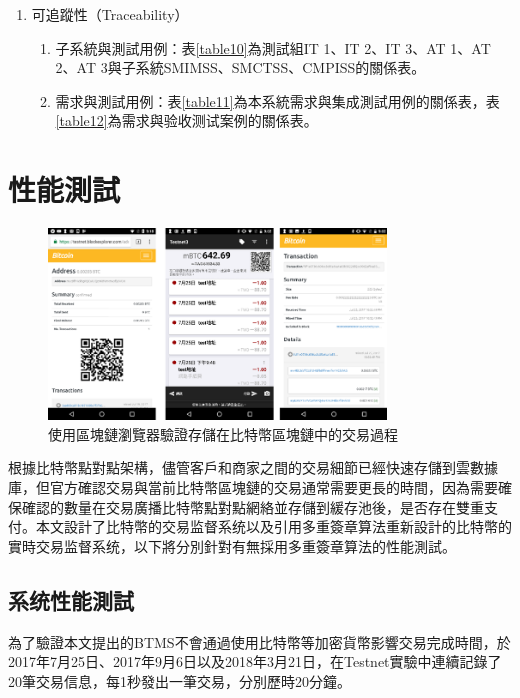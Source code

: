 \begin{enumerate}
			\item 可追蹤性（Traceability）

						

			\begin{enumerate}
				\item 子系統與測試用例：表\ref{table10}為測試組IT 1、IT 2、IT 3、AT 1、AT 2、AT 3與子系統SMIMSS、SMCTSS、CMPISS的關係表。
				\item 需求與測試用例：表\ref{table11}為本系統需求與集成測試用例的關係表，表\ref{table12}為需求與验收测试案例的關係表。
				\end{enumerate}
		\end{enumerate}







	\section{性能測試}


		\begin{figure}[!htbp]
			\centering
			\includegraphics[width = 0.8\textwidth]{fig9.png}
			\caption{使用區塊鏈瀏覽器驗證存儲在比特幣區塊鏈中的交易過程}\label{fig9}
		\end{figure}


		根據比特幣點對點架構，儘管客戶和商家之間的交易細節已經快速存儲到雲數據庫，但官方確認交易與當前比特幣區塊鏈的交易通常需要更長的時間，因為需要確保確認的數量在交易廣播比特幣點對點網絡並存儲到緩存池後，是否存在雙重支付。本文設計了比特幣的交易监督系统以及引用多重簽章算法重新設計的比特幣的實時交易监督系统，以下將分別針對有無採用多重簽章算法的性能測試。


		\subsection{系统性能測試}
		為了驗證本文提出的BTMS不會通過使用比特幣等加密貨幣影響交易完成時間，於2017年7月25日、2017年9月6日以及2018年3月21日，在Testnet實驗中連續記錄了20筆交易信息，每1秒發出一筆交易，分別歷時20分鐘。

